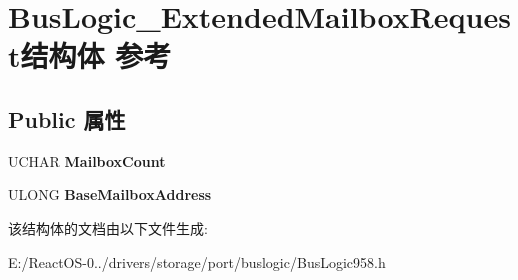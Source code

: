 \hypertarget{struct_bus_logic___extended_mailbox_request}{}\section{Bus\+Logic\+\_\+\+Extended\+Mailbox\+Request结构体 参考}
\label{struct_bus_logic___extended_mailbox_request}
\subsection*{Public 属性}
\begin{DoxyCompactItemize}
\item 
\mbox{\label{struct_bus_logic___extended_mailbox_request_a63cffa7a41807193d60eb540a916bcbf}} 
U\+C\+H\+AR {\bfseries Mailbox\+Count}
\item 
\mbox{\label{struct_bus_logic___extended_mailbox_request_aad4e2229cb39cb0d1006432720f73f54}} 
U\+L\+O\+NG {\bfseries Base\+Mailbox\+Address}
\end{DoxyCompactItemize}


该结构体的文档由以下文件生成\+:\begin{DoxyCompactItemize}
\item 
E\+:/\+React\+O\+S-\/0../drivers/storage/port/buslogic/Bus\+Logic958.\+h\end{DoxyCompactItemize}
